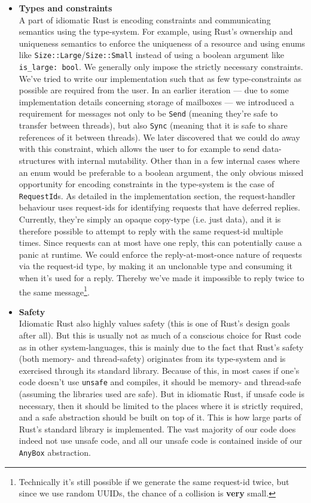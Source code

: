\documentclass[a4paper]{article}
\begin{document}
\begin{itemize}
\item {\bf Types and constraints} \\
A part of idiomatic Rust is encoding constraints and communicating
semantics using the type-system. For example, using Rust's ownership and
uniqueness semantics to enforce the uniqueness of a resource and using enums
like \texttt{Size::Large}/\texttt{Size::Small} instead of using a boolean
argument like \texttt{is\_large: bool}. We generally only impose the strictly
necessary constraints. We've tried to write our implementation such that as few
type-constraints as possible are required from the user. In an earlier
iteration --- due to some implementation details concerning storage of mailboxes
--- we introduced a requirement for messages not only to be \texttt{Send}
(meaning they're safe to transfer between threads), but also \texttt{Sync}
(meaning that it is safe to share references of it between threads). We later
discovered that we could do away with this constraint, which allows the user to
for example to send data-structures with internal mutability. Other than in a few
internal cases where an enum would be preferable to a boolean argument, the only
obvious missed opportunity for encoding constraints in the type-system is the
case of \texttt{RequestId}s. As detailed in the implementation section, the
request-handler behaviour uses request-ids for identifying requests that have
deferred replies. Currently, they're simply an opaque copy-type (i.e. just data),
and it is therefore possible to attempt to reply with the same request-id
multiple times. Since requests can at most have one reply, this can potentially
cause a panic at runtime. We could enforce the reply-at-most-once nature of
requests via the request-id type, by making it an unclonable type and consuming
it when it's used for a reply. Thereby we've made it impossible to reply twice
to the same message\footnote{Technically it's still possible if we generate the
  same request-id twice, but since we use random UUIDs, the chance of a
  collision is {\bf very} small.}.

\item {\bf Safety} \\
Idiomatic Rust also highly values safety (this is one of Rust's design goals after
all). But this is usually not as much of a conscious choice for Rust code as in
other system-languages, this is mainly due to the fact that Rust's safety
(both memory- and thread-safety) originates from its type-system and is exercised
through its standard library. Because of this, in most cases if one's code
doesn't use \texttt{unsafe} and compiles, it should be memory- and thread-safe
(assuming the libraries used are safe). But in idiomatic Rust, if unsafe code is
necessary, then it should be limited to the places where it is strictly
required, and a safe abstraction should be built on top of it. This is how large
parts of Rust's standard library is implemented. The vast majority of our code
does indeed not use unsafe code, and all our unsafe code is contained inside of
our \texttt{AnyBox} abstraction.


\end{itemize}
\end{document}
